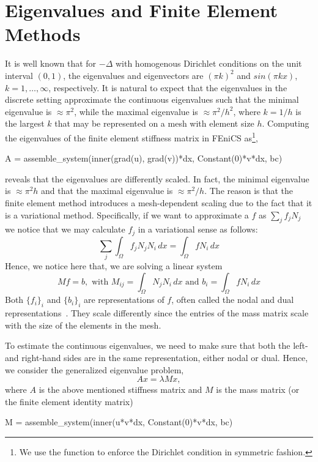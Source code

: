 \section{Eigenvalues and Finite Element Methods}
\label{sec:eig and fem}

It is well known that for $-\Delta$  with homogenous Dirichlet conditions on the unit
interval $(0,1)$, 
the eigenvalues 
and eigenvectors
are $(\pi k)^2$ and $sin(\pi k x)$, $k=1, \ldots, \infty$, respectively. 
It is natural to expect that the eigenvalues in the discrete setting
approximate the continuous eigenvalues such that 
the minimal eigenvalue is $\approx \pi^2$, while the maximal eigenvalue
is $\approx \pi^2 /h^2$, where $k=1/h$ is the largest $k$ that may be represented
on a mesh with element size $h$.  
Computing the eigenvalues of the finite element stiffness matrix in FEniCS as\footnote{
We use the  function to enforce the Dirichlet
condition in symmetric fashion.}, 
\begin{python}
A = assemble_system(inner(grad(u), grad(v))*dx, Constant(0)*v*dx, bc)
\end{python}
reveals that the eigenvalues are differently scaled. In fact, the minimal 
eigenvalue is $\approx \pi^2 h$ and that the maximal eigenvalue is  $\approx \pi^2/h$.      
The reason is that the finite element method introduces a mesh-dependent 
scaling due to the fact that it is a variational method. 
Specifically, if we want to approximate a $f$ as $\sum_j f_j N_j$ we notice
that we may calculate $f_j$ in a variational sense as follows: 
\[
 \sum_j \int_\Omega f_j N_j N_i \, dx = \int_\Omega f N_i \, dx   
\]
Hence, we notice here that, we are solving a linear system
\[
	M f = b, \mbox{ with } M_{ij} = \int_\Omega N_j N_i \, dx \mbox{ and } b_i = \int_\Omega f N_i \, dx  
\]
Both $\{f_i\}_i$ and $\{b_i\}_i$ are representations of $f$, often called the nodal and dual representations~\cite{mardal2011preconditioning}. They scale differently since
the entries of the mass matrix scale with the size of the elements in the mesh. 

To estimate the continuous eigenvalues, we  need to make sure that both the left- and right-hand sides are in the same representation, either nodal
or dual. Hence, we consider the generalized eigenvalue problem, 
\begin{equation} 
\label{geneig}
A x = \lambda M x,   
\end{equation} 
where $A$ is the above mentioned stiffness matrix and $M$ is the mass
matrix (or the finite element identity matrix) 
\begin{python}
M = assemble_system(inner(u*v*dx, Constant(0)*v*dx, bc)
\end{python}


